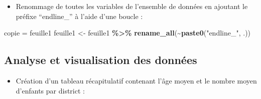 \documentclass[
]{article}
\newenvironment{Shaded}{\begin{snugshade}}{\end{snugshade}}
\newcommand{\FunctionTok}[1]{\textcolor[rgb]{0.13,0.29,0.53}{\textbf{#1}}}
\newcommand{\NormalTok}[1]{#1}
\newcommand{\OtherTok}[1]{\textcolor[rgb]{0.56,0.35,0.01}{#1}}
\newcommand{\SpecialCharTok}[1]{\textcolor[rgb]{0.81,0.36,0.00}{\textbf{#1}}}
\newcommand{\StringTok}[1]{\textcolor[rgb]{0.31,0.60,0.02}{#1}}
\providecommand{\tightlist}{%
  \setlength{\itemsep}{0pt}\setlength{\parskip}{0pt}}
\begin{document}
\begin{itemize}
\tightlist
\item
  Renommage de toutes les variables de l'ensemble de données en ajoutant
  le préfixe ``endline\_'' à l'aide d'une boucle :
\end{itemize}

\begin{Shaded}
\begin{Highlighting}[]
\NormalTok{copie }\OtherTok{=}\NormalTok{ feuille1}
\NormalTok{feuille1 }\OtherTok{\textless{}{-}}\NormalTok{ feuille1 }\SpecialCharTok{\%\textgreater{}\%}
  \FunctionTok{rename\_all}\NormalTok{(}\SpecialCharTok{\textasciitilde{}}\FunctionTok{paste0}\NormalTok{(}\StringTok{"endline\_"}\NormalTok{, .))}
\end{Highlighting}
\end{Shaded}

\hypertarget{analyse-et-visualisation-des-donnuxe9es}{%
\subsection{Analyse et visualisation des
données}\label{analyse-et-visualisation-des-donnuxe9es}}

\begin{itemize}
\tightlist
\item
  Création d'un tableau récapitulatif contenant l'âge moyen et le nombre
  moyen d'enfants par district :
\end{itemize}
\end{document}
